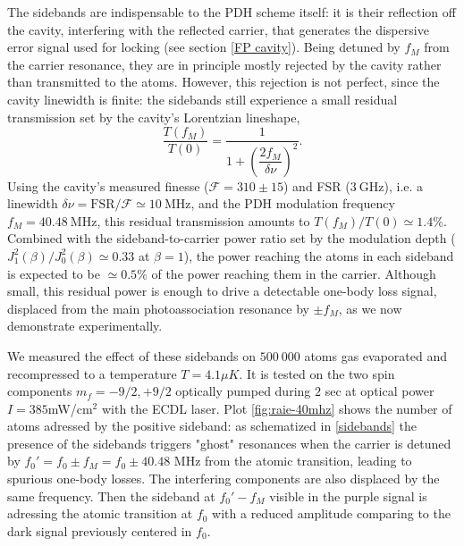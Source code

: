 The sidebands are indispensable to the PDH scheme itself: it is their reflection off the cavity, interfering with the reflected carrier, that generates the dispersive error signal used for locking (see section \ref{FP cavity}). Being detuned by $f_M$ from the carrier resonance, they are in principle mostly rejected by the cavity rather than transmitted to the atoms. However, this rejection is not perfect, since the cavity linewidth is finite: the sidebands still experience a small residual transmission set by the cavity's Lorentzian lineshape,
\begin{equation}
\frac{T(f_M)}{T(0)} = \frac{1}{1+\left(\dfrac{2f_M}{\delta\nu}\right)^2}.
\end{equation}
Using the cavity's measured finesse ($\mathcal{F} = 310 \pm 15$) and FSR ($3~\text{GHz}$), i.e. a linewidth $\delta\nu = \text{FSR}/\mathcal{F} \simeq 10~\text{MHz}$, and the PDH modulation frequency $f_M = 40.48~\text{MHz}$, this residual transmission amounts to $T(f_M)/T(0) \simeq 1.4\%$. Combined with the sideband-to-carrier power ratio set by the modulation depth ($J_1^2(\beta)/J_0^2(\beta) \simeq 0.33$ at $\beta=1$), the power reaching the atoms in each sideband is expected to be $\simeq 0.5\%$ of the power reaching them in the carrier. Although small, this residual power is enough to drive a detectable one-body loss signal, displaced from the main photoassociation resonance by $\pm f_M$, as we now demonstrate experimentally.

We measured the effect of these sidebands on $500~000$ atoms gas evaporated and recompressed to a temperature $T = 4.1\mu K$. It is tested on the two spin components $m_f=-9/2, +9/2$ 
optically pumped during $2$ sec at optical power $I = 385$mW/cm$^2$ with the ECDL laser.
Plot \ref{fig:raie-40mhz} shows the number of atoms adressed by the positive sideband:
as schematized in \ref{sidebands} the presence of the sidebands triggers "ghost" resonances when the carrier is detuned by $f_0' = f_0 \pm f_M = f_0 \pm 40.48$ MHz 
from the atomic transition, leading to spurious one-body losses. The interfering components are also displaced by the same frequency.
Then the sideband at $f_0'-f_M$ visible in the purple signal is adressing the atomic transition at $f_0$ with a reduced amplitude comparing to the dark signal
previously centered in $f_0$.

